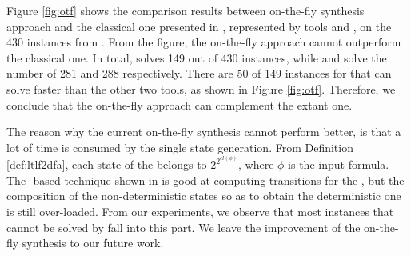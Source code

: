 Figure \ref{fig:otf} shows the comparison results between on-the-fly synthesis approach and the classical one presented in \cite{GV15}, represented by tools \syft and \lisasyft, on the 430 instances from \cite{BLTV20}. From the figure, the on-the-fly approach cannot outperform the classical one. In total, \toolname solves 149 out of 430 instances, while \syft and \lisasyft solve the number of 281 and 288 respectively. There are 50 of 149 instances for that \toolname can solve faster than the other two tools, as shown in Figure \ref{fig:otf}. Therefore, we conclude that the on-the-fly approach can complement the extant one. 

The reason why the current on-the-fly synthesis cannot perform better, is that a lot of time is consumed by the single \tdfa state generation. From Definition \ref{def:ltlf2dfa}, each state of the \tdfa belongs to $2^{2^{cl(\phi)}}$, where $\phi$ is the input formula. The \SAT-based technique shown in \cite{LRPZV19} is good at computing transitions for the \NFA, but the composition of the non-deterministic states so as to obtain the deterministic one is still over-loaded. From our experiments, we observe that most instances that cannot be solved by \toolname fall into this part. We leave the improvement of the on-the-fly synthesis to our future work.





